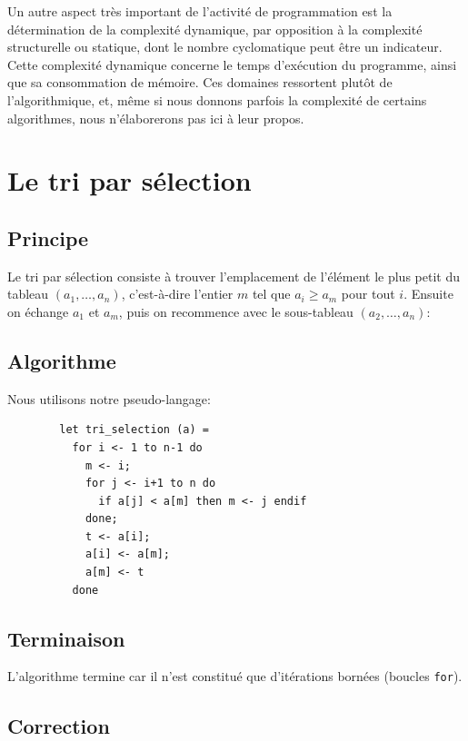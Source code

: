 \documentclass[11pt,a4paper]{article}
\begin{document}
Un autre aspect très important de l'activité de programmation est la
détermination de la complexité dynamique, par opposition à la
complexité structurelle ou statique, dont le nombre cyclomatique peut
être un indicateur. Cette complexité dynamique concerne le temps
d'exécution du programme, ainsi que sa consommation de mémoire. Ces
domaines ressortent plutôt de l'algorithmique, et, même si nous
donnons parfois la complexité de certains algorithmes, nous
n'élaborerons pas ici à leur propos.


\section{Le tri par sélection}

  \subsection{Principe}

    Le tri par sélection consiste à trouver l'emplacement de l'élément
    le plus petit du tableau $(a_1, \ldots, a_n)$, c'est-à-dire
    l'entier $m$ tel que $a_i \geqslant a_m$ pour tout $i$. Ensuite on
    échange $a_1$ et $a_m$, puis on recommence avec le sous-tableau
    $(a_2, \ldots, a_n)$:

  \subsection{Algorithme}

    \noindent
    Nous utilisons notre pseudo-langage:

      \begin{verbatim}
        let tri_selection (a) =
          for i <- 1 to n-1 do
            m <- i;
            for j <- i+1 to n do
              if a[j] < a[m] then m <- j endif
            done;
            t <- a[i];
            a[i] <- a[m];
            a[m] <- t
          done
      \end{verbatim}


    \subsection{Terminaison}

      \noindent
      L'algorithme termine car il n'est constitué que d'itérations
      bornées (boucles \verb+for+).

    \subsection{Correction}
\end{document}
